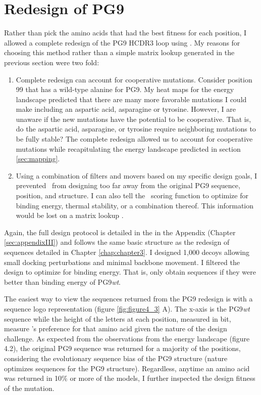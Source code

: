 \section{Redesign of PG9}
Rather than pick the amino acids that had the best fitness for each position, I allowed a complete redesign of the PG9 HCDR3 loop using \rosettadesign. My reasons for choosing this method rather than a simple matrix lookup generated in the previous section were two fold:
\begin{enumerate}
\item Complete redesign can account for cooperative mutations. Consider position 99 that has a wild-type alanine for PG9. My heat maps for the energy landscape predicted that there are many more favorable mutations I could make including an aspartic acid, asparagine or tyrosine. However, I are unaware if the new mutations have the potential to be cooperative. That is, do the aspartic acid, asparagine, or tyrosine require neighboring mutations to be fully stable? The complete redesign allowed us to account for cooperative mutations while recapitulating the energy landscape predicted in section \ref{sec:mapping}.
\item Using a combination of filters and movers based on my specific design goals, I prevented \rosetta~from designing too far away from the original PG9 sequence, position, and structure. I can also tell the \rosetta~scoring function to optimize for binding energy, thermal stability, or a combination thereof. This information would be lost on a matrix lookup \citep{Fleishman:2011ji,Kaufmann:2010ea,Kuhlman:2000tc}.
\end{enumerate}

Again, the full design protocol is detailed in the in the Appendix (Chapter \ref{sec:appendixIII}) and follows the same basic structure as the redesign of sequences detailed in Chapter \ref{chap:chapter3}. I designed 1,000 decoys allowing small docking perturbations and minimal backbone movement. I filtered the design to optimize for binding energy. That is, only obtain sequences if they were better than binding energy of PG9\textit{wt}.

The easiest way to view the sequences returned from the PG9 redesign is with a sequence logo representation (figure \ref{fig:figure4_3} A). The x-axis is the PG9\textit{wt} sequence while the height of the letters at each position, measured in bit, measure \rosetta's preference for that amino acid given the nature of the design challenge. As expected from the observations from the energy landscape (figure 4.2), the original PG9 sequence was returned for a majority of the positions, considering the evolutionary sequence bias of the PG9 structure (nature optimizes sequences for the PG9 structure).  Regardless, anytime an amino acid was returned in 10\% or more of the models, I further inspected the design fitness of the mutation.

